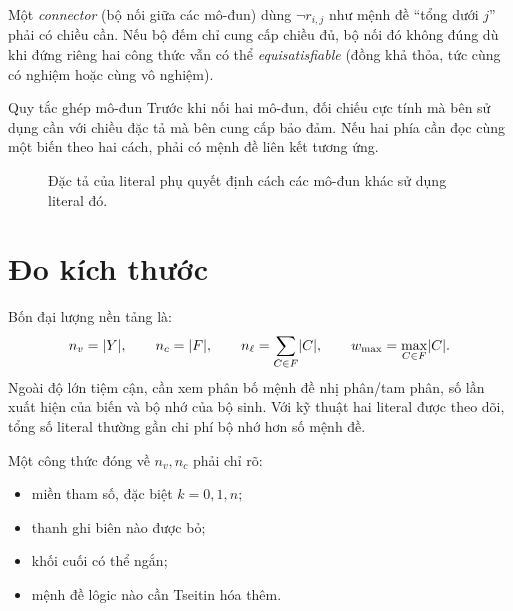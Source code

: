 Một \emph{connector} (bộ nối giữa các mô-đun) dùng \(\neg r_{i,j}\) như mệnh
đề ``tổng dưới \(j\)'' phải có chiều cần. Nếu bộ đếm chỉ cung cấp chiều đủ,
bộ nối đó không đúng dù khi đứng riêng hai công thức vẫn có thể
\emph{equisatisfiable} (đồng khả thỏa, tức cùng có nghiệm hoặc cùng vô nghiệm).

\begin{designrule}{Quy tắc ghép mô-đun}
Trước khi nối hai mô-đun, đối chiếu cực tính mà bên sử dụng cần với chiều đặc
tả mà bên cung cấp bảo đảm. Nếu hai phía cần đọc cùng một biến theo hai cách,
phải có mệnh đề liên kết tương ứng.
\end{designrule}

\begin{figure}[tb]
\centering
{}
\caption{Đặc tả của literal phụ quyết định cách các mô-đun khác sử dụng literal đó.}
\label{fig:provider-client-contract}
\end{figure}

\section{Đo kích thước}

Bốn đại lượng nền tảng là:
\[
  n_v=\lvert Y\rvert,\qquad
  n_c=\lvert F\rvert,\qquad
  n_\ell=\sum_{C\in F}\lvert C\rvert,\qquad
  w_{\max}=\max_{C\in F}\lvert C\rvert.
\]
Ngoài độ lớn tiệm cận, cần xem phân bố mệnh đề nhị phân/tam phân, số lần xuất
hiện của biến và bộ nhớ của bộ sinh. Với kỹ thuật hai literal được theo dõi,
tổng số literal thường gần chi phí bộ nhớ hơn số mệnh đề.

Một công thức đóng về \(n_v,n_c\) phải chỉ rõ:
\begin{itemize}
  \item miền tham số, đặc biệt \(k=0,1,n\);
  \item thanh ghi biên nào được bỏ;
  \item khối cuối có thể ngắn;
  \item mệnh đề lôgic nào cần Tseitin hóa thêm.
\end{itemize}

